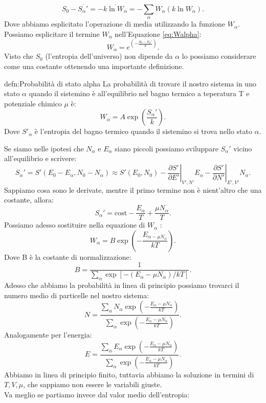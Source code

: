 \[
	S_0- \overline{S_{\alpha}'}= - \overline{k\ln W_{\alpha}}= -\sum_{\alpha}^{} W_{\alpha} \left( k\ln W_{\alpha} \right)  
.\] 
Dove abbiamo esplicitato l'operazione di media utilizzando la funzione $W_{\alpha}$. 
Possiamo esplicitare il termine $W_\alpha$ nell'Equazione \ref{eq:Walpha}:
\[
	W_{\alpha}= e^{\left( -\frac{S_0-S_{\alpha}'}{k} \right)}  
.\] 
Visto che $S_0$ (l'entropia dell'universo) non dipende da $\alpha$ lo possiamo considerare come una costante ottenendo una importante definizione.
\begin{defn}{defn:Probabilità di stato alpha}
La probabilità di trovare il nostro sistema in uno stato $\alpha$ quando il sistemino è all'equilibrio nel bagno termico a teperatura T e potenziale chimico $\mu$ è:
\[
	W_{\alpha}= A \exp{\left( \frac{S_{\alpha}'}{k} \right) }
.\] 
Dove $S'_\alpha$ è l'entropia del bagno termico quando il sistemino si trova nello stato $\alpha$.
\end{defn}
Se siamo nelle ipotesi che $N_{\alpha}$ e $E_{\alpha}$ siano piccoli possiamo sviluppare $S_{\alpha}'$ vicino all'equilibrio e scrivere:
\[
	S_{\alpha}' = S'\left( E_0- E_{\alpha}, N_0- N_{\alpha} \right) \approx S' \left( E_0, N_0 \right) -
	\left.\frac{\partial S'}{\partial E'} \right|_{V', N'} E_{\alpha} - \left.\frac{\partial S'}{\partial N'} \right|_{E', V'} N_{\alpha}
.\] 
Sappiamo cosa sono le derivate, mentre il primo termine non è nient'altro che una costante, allora:
\[
	S_{\alpha}' = \text{cost} - \frac{E_{\alpha}}{T} + \frac{\mu N_{\alpha}}{T}
.\] 
Possiamo adesso sostituire nella equazione di $W_{\alpha}$ :
\[
	W_{\alpha} = B \exp\left( - \frac{E_{\alpha - \mu N_{\alpha}}}{kT} \right) 
.\]
Dove B è la costante di normalizzazione:
\[
	B = \frac{1}{\sum_{\alpha}^{} \exp \left[ -\left( E_{\alpha}-\mu N_\alpha \right)/kT  \right] }
.\] 
Adesso che abbiamo la probabilità in linea di principio possiamo trovarci il numero medio di particelle nel nostro sistema:
\[
	N = \frac{\sum_{\alpha}^{} N_{\alpha} \exp\left( - \frac{E_{\alpha}- \mu N_{\alpha}}{kT} \right) }{\sum_{\alpha}^{} \exp\left( -\frac{E_{\alpha}-\mu N_{\alpha}}{kT} \right) }
.\] 
Analogamente per l'energia:
\[
	E = \frac{\sum_{\alpha}^{} E_{\alpha}\exp\left( -\frac{E_{\alpha}-\mu N_{\alpha}}{kT} \right) }{\sum_{\alpha}^{} \exp\left( -\frac{E_{\alpha}-\mu N_{\alpha}}{kT} \right) }
.\] 
Abbiamo in linea di principio finito, tuttavia abbiamo la soluzione in termini di $T, V, \mu$, che sappiamo non essere le variabili giuste.\\ 
Va meglio se partiamo invece dal valor medio dell'entropia:
